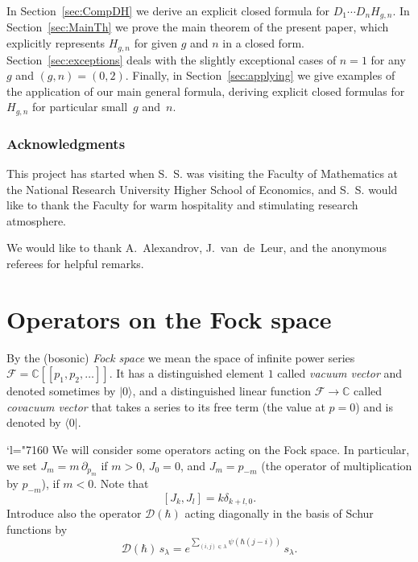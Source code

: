 \documentclass[JEP,XML,SOM,Unicode,NoEqCountersInSection,NoFloatCountersInSection]{cedram}
\let\mathcal\mathscr
\newcommand{\llbracket}{[\![}
\newcommand{\rrbracket}{]\!]}
\newcommand{\Changel}{\mathcode`l="7160}
\newcommand{\C}{\mathbb{C}}
\theoremstyle{plain}
\theoremstyle{definition}
\theoremstyle{remark}
\newcommand{\cF}{\mathcal{F}}
\newcommand{\Hc}{H}
\begin{document}
In Section~\ref{sec:CompDH} we derive an explicit closed formula for $D_1\cdots D_n\Hc_{g,n}$. In Section~\ref{sec:MainTh} we prove the main theorem of the present paper, which explicitly represents $\Hc_{g,n}$ for given $g$ and $n$ in a closed form. Section~\ref{sec:exceptions} deals with the slightly exceptional cases of $n=1$ for any $g$ and $(g,n)=(0,2)$. Finally, in Section~\ref{sec:applying} we give examples of the application of our main general formula, deriving explicit closed formulas for $H_{g,n}$ for particular small~$g$ and~$n$.

\subsubsection*{Acknowledgments}
This project has started when S.~S. was visiting the Faculty of Mathematics at the National Research University Higher School of Economics, and S.~S. would like to thank the Faculty for warm hospitality and stimulating research atmosphere.

We would like to thank A.~Alexandrov, J.~van~de~Leur, and the anonymous referees for helpful remarks.

\section{Operators on the Fock space} \label{sec:OperFockSpace}

By the (bosonic) \emph{Fock space} we mean the space of infinite power series $\cF=\C\llbracket p_1,p_2,\dots\rrbracket $. It has a distinguished element $1$ called \emph{vacuum vector} and denoted sometimes by $\big| 0 \big\rangle$, and a distinguished linear function $\cF\to\C$ called \emph{covacuum vector} that takes a series to its free term (the value at $p=0$) and is denoted by $\big\langle 0 \big|$.

\Changel
We will consider some operators acting on the Fock space. In particular, we set $J_m=m\,\partial_{p_m}$ if $m>0$, $J_0=0$, and $J_m=p_{-m}$ (the operator of multiplication by $p_{-m}$), if $m<0$. Note that
\begin{equation}\label{eq:Jcomm}
[J_k, J_l] = k\delta_{k+l,0}.
\end{equation}
Introduce also the operator $\mathcal{D}(\hbar)$ acting diagonally in the basis of Schur functions by
\begin{equation*} \label{eq:action-of-D}
\mathcal{D}(\hbar)\,s_\lambda =
e^{\sum\limits_{(i,j)\in\lambda} \psi(\hbar(j-i))}\,s_\lambda.
\end{equation*}
\end{document}
